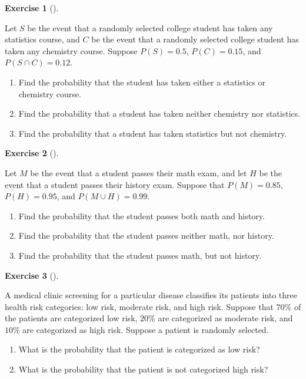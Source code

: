\documentclass[
  letterpaper,
  DIV=11,
  numbers=noendperiod]{scrreprt}
\providecommand{\tightlist}{%
  \setlength{\itemsep}{0pt}\setlength{\parskip}{0pt}}\usepackage{longtable,booktabs,array}
\theoremstyle{definition}
\newtheorem{exercise}{Exercise}[chapter]
\theoremstyle{definition}
\theoremstyle{definition}
\theoremstyle{remark}
\begin{document}
\begin{exercise}[]\protect\hypertarget{exr-3.5}{}\label{exr-3.5}

Let \(S\) be the event that a randomly selected college student has
taken any statistics course, and \(C\) be the event that a randomly
selected college student has taken any chemistry course. Suppose
\(P(S) = 0.5\), \(P(C) = 0.15\), and \(P(S\cap C) = 0.12\).

\begin{enumerate}
\def\labelenumi{\alph{enumi}.}
\tightlist
\item
  Find the probability that the student has taken either a statistics or
  chemistry course.
\item
  Find the probability that a student has taken neither chemistry nor
  statistics.
\item
  Find the probability that a student has taken statistics but not
  chemistry.
\end{enumerate}

\end{exercise}

\begin{exercise}[]\protect\hypertarget{exr-3.6}{}\label{exr-3.6}

Let \(M\) be the event that a student passes their math exam, and let
\(H\) be the event that a student passes their history exam. Suppose
that \(P(M) = 0.85\), \(P(H) = 0.95\), and \(P(M\cup H) = 0.99\).

\begin{enumerate}
\def\labelenumi{\alph{enumi}.}
\tightlist
\item
  Find the probability that the student passes both math and history.
\item
  Find the probability that the student passes neither math, nor
  history.
\item
  Find the probability that the student passes math, but not history.
\end{enumerate}

\end{exercise}

\begin{exercise}[]\protect\hypertarget{exr-3.7}{}\label{exr-3.7}

A medical clinic screening for a particular disease classifies its
patients into three health risk categories: low risk, moderate risk, and
high risk. Suppose that \(70\%\) of the patients are categorized low
risk, \(20\%\) are categorized as moderate risk, and \(10\%\) are
categorized as high risk. Suppose a patient is randomly selected.

\begin{enumerate}
\def\labelenumi{\alph{enumi}.}
\tightlist
\item
  What is the probability that the patient is categorized as low risk?
\item
  What is the probability that the patient is not categorized high risk?
\end{enumerate}

\end{exercise}
\end{document}

